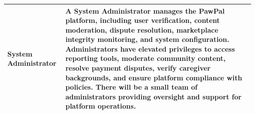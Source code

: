 \begin{table}[]
{\begin{tabular}{p{} p{}}
System Administrator & A System Administrator manages the PawPal platform, including user verification, content moderation, dispute resolution, marketplace integrity monitoring, and system configuration. Administrators have elevated privileges to access reporting tools, moderate community content, resolve payment disputes, verify caregiver backgrounds, and ensure platform compliance with policies. There will be a small team of administrators providing oversight and support for platform operations. \\ \hline
\end{tabular}%
}
\end{table}
